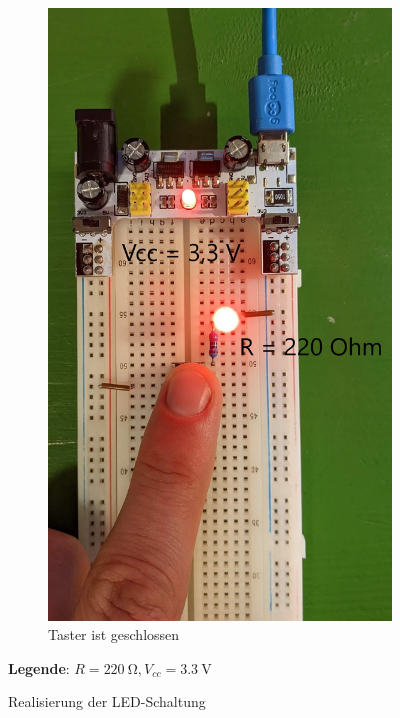 \documentclass[
    paper=a4,
]{scrartcl}
\newcommand{\legend}[1]{\par\footnotesize\textbf{Legende}: #1\par}
\begin{document}
\begin{figure}
\begin{subfigure}[t]{0.5\textwidth}
            \includegraphics[width=0.5\linewidth]{Anhang/Bild1.2.jpg}
            \caption{Taster ist geschlossen}
        \end{subfigure}
        \caption{Realisierung der LED-Schaltung}
        \legend{\(R=\SI{220}{\ohm}, V_{cc}=\SI{3.3}{\volt}\)}
        \label{fig:1}
    \end{figure}
\end{document}
